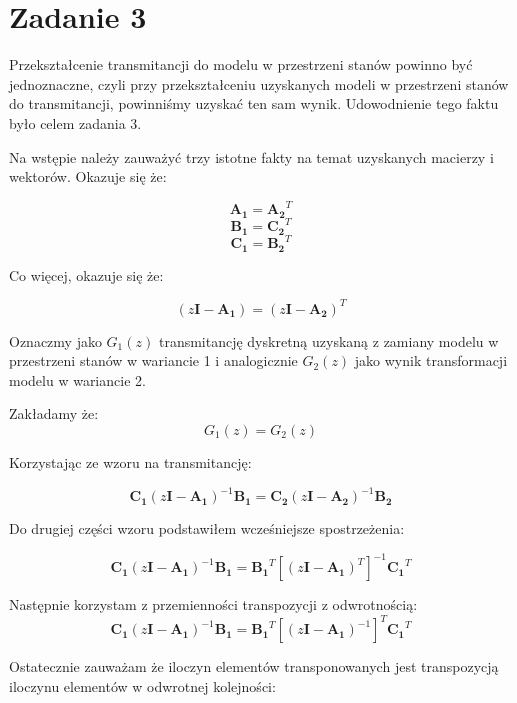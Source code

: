 \documentclass[a4paper,titlepage,11pt,floatssmall]{mwrep}
\begin{document}
\section{Zadanie 3}
\indent{} Przekształcenie transmitancji do modelu w przestrzeni stanów powinno być jednoznaczne, czyli przy przekształceniu uzyskanych modeli w przestrzeni stanów do transmitancji, powinniśmy uzyskać ten sam wynik. Udowodnienie tego faktu było celem zadania 3.

\indent{} Na wstępie należy zauważyć trzy istotne fakty na temat uzyskanych macierzy i wektorów. Okazuje się że:

\begin{equation*}
\mathbf{A_1} = \mathbf{A_2}^{T}
\end{equation*}
\begin{equation*}
\mathbf{B_1} = \mathbf{C_2}^{T}
\end{equation*}
\begin{equation*}
\mathbf{C_1} = \mathbf{B_2}^{T}
\end{equation*}

Co więcej, okazuje się że:

\begin{equation*}
(z\mathbf{I} - \mathbf{A_1}) = (z\mathbf{I} - \mathbf{A_2})^{T}
\end{equation*}

Oznaczmy jako $G_1(z)$ transmitancję dyskretną uzyskaną z zamiany modelu w przestrzeni stanów w wariancie 1 i analogicznie $G_2(z)$ jako wynik transformacji modelu w wariancie 2. 

Zakładamy że:
$$
G_1(z) = G_2(z)
$$

Korzystając ze wzoru na transmitancję:

$$
\mathbf{C_1} (z\mathbf{I} - \mathbf{A_1})^{-1}\mathbf{B_1} = \mathbf{C_2} (z\mathbf{I} - \mathbf{A_2})^{-1}\mathbf{B_2}
$$

Do drugiej części wzoru podstawiłem wcześniejsze spostrzeżenia:

$$
\mathbf{C_1} (z\mathbf{I} - \mathbf{A_1})^{-1} \mathbf{B_1} = \mathbf{B_1}^{T} [(z\mathbf{I} - \mathbf{A_1})^{T}]^{-1} \mathbf{C_1}^{T}
$$

Następnie korzystam z przemienności transpozycji z odwrotnością:
$$
\mathbf{C_1} (z\mathbf{I} - \mathbf{A_1})^{-1} \mathbf{B_1} = \mathbf{B_1}^{T} [(z\mathbf{I} - \mathbf{A_1})^{-1}]^{T} \mathbf{C_1}^{T}
$$

Ostatecznie zauważam że iloczyn elementów transponowanych jest transpozycją iloczynu elementów w odwrotnej kolejności:
\end{document}
